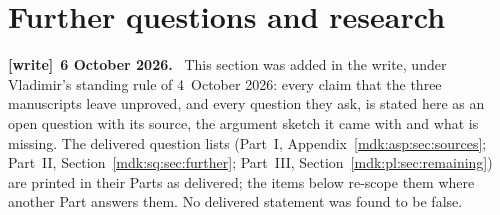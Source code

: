 \documentclass[11pt,letterpaper]{article}
\numberwithin{equation}{section}
\theoremstyle{remark}\newtheorem{remark}[theorem]{Remark}
\newenvironment{writenote}[1][]{\par\smallskip\begingroup\small
 \noindent\textbf{[write]}\if\relax\detokenize{#1}\relax\else~\textbf{#1.}\fi\ }%
 {\par\endgroup\smallskip}
\begin{document}
\section{Further questions and research}\label{mdk:sec:further}
\begin{writenote}[6 October 2026]
This section was added in the write, under Vladimir's standing rule of 4~October 2026: every claim that the three manuscripts leave unproved, and every question they ask, is stated here as an open question with its source, the argument sketch it came with and what is missing. The delivered question lists (Part~I, Appendix~\ref{mdk:asp:sec:sources}; Part~II, Section~\ref{mdk:sq:sec:further}; Part~III, Section~\ref{mdk:pl:sec:remaining}) are printed in their Parts as delivered; the items below re-scope them where another Part answers them. No delivered statement was found to be false.
\end{writenote}
\end{document}
